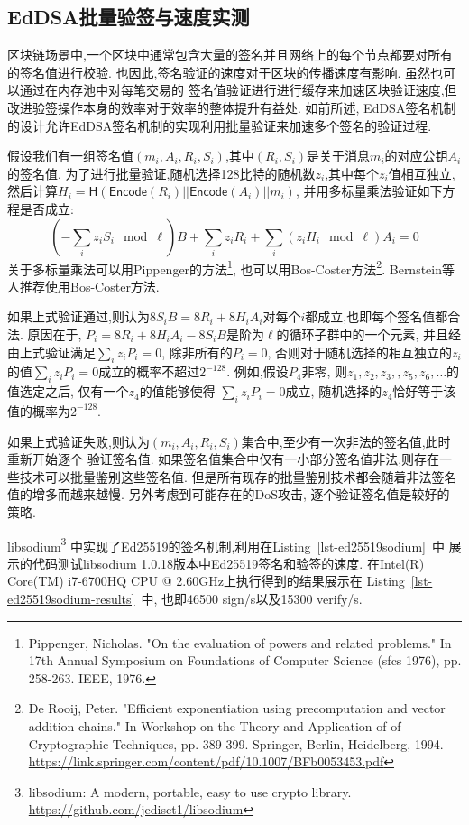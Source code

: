 \subsection{EdDSA批量验签与速度实测}

区块链场景中,一个区块中通常包含大量的签名并且网络上的每个节点都要对所有的签名值进行校验.
也因此,签名验证的速度对于区块的传播速度有影响. 虽然也可以通过在内存池中对每笔交易的
签名值验证进行进行缓存来加速区块验证速度,但改进验签操作本身的效率对于效率的整体提升有益处.
如前所述, EdDSA签名机制的设计允许EdDSA签名机制的实现利用批量验证来加速多个签名的验证过程.

假设我们有一组签名值$(m_i, A_i, R_i, S_i)$,其中$(R_i, S_i)$是关于消息$m_i$的对应公钥$A_i$的签名值.
为了进行批量验证,随机选择128比特的随机数$z_i$,其中每个$z_i$值相互独立,
然后计算$H_i = \textsf{H}(\textsf{Encode}(R_i) || \textsf{Encode}(A_i) ||m_i)$,
并用多标量乘法验证如下方程是否成立:
$$
\left(-\sum_i z_iS_i \mod \ell\right)B + \sum_i z_i R_i + \sum_i(z_iH_i \mod \ell)A_i = 0
$$
关于多标量乘法可以用Pippenger的方法\footnote{
Pippenger, Nicholas. "On the evaluation of powers and related problems." 
In 17th Annual Symposium on Foundations of Computer Science (sfcs 1976), 
pp. 258-263. IEEE, 1976.},
也可以用Bos-Coster方法\footnote{
De Rooij, Peter. "Efficient exponentiation using precomputation and vector addition chains." 
In Workshop on the Theory and Application of of Cryptographic Techniques, 
pp. 389-399. Springer, Berlin, Heidelberg, 1994.
\url{https://link.springer.com/content/pdf/10.1007/BFb0053453.pdf}}.
Bernstein等人推荐使用Bos-Coster方法.

如果上式验证通过,则认为$8S_iB = 8R_i + 8H_iA_i$对每个$i$都成立,也即每个签名值都合法.
原因在于, $P_i = 8R_i + 8H_iA_i - 8S_iB$是阶为$\ell$的循环子群中的一个元素,
并且经由上式验证满足$\sum_i z_iP_i = 0$, 除非所有的$P_i = 0$, 
否则对于随机选择的相互独立的$z_i$的值$\sum_i z_iP_i = 0$成立的概率不超过$2^{-128}$.
例如,假设$P_4$非零, 则$z_1, z_2, z_3, , z_5, z_6, \ldots$的值选定之后, 仅有一个$z_4$的值能够使得
$\sum_i z_iP_i = 0$成立, 随机选择的$z_4$恰好等于该值的概率为$2^{-128}$.

如果上式验证失败,则认为$(m_i, A_i, R_i, S_i)$集合中,至少有一次非法的签名值,此时重新开始逐个
验证签名值. 如果签名值集合中仅有一小部分签名值非法,则存在一些技术可以批量鉴别这些签名值.
但是所有现存的批量鉴别技术都会随着非法签名值的增多而越来越慢. 另外考虑到可能存在的DoS攻击,
逐个验证签名值是较好的策略.

libsodium\footnote{libsodium: A modern, portable, easy to use crypto library.
\url{https://github.com/jedisct1/libsodium}}
中实现了Ed25519的签名机制,利用在Listing~\ref{lst-ed25519sodium}~中
展示的代码测试libsodium 1.0.18版本中Ed25519签名和验签的速度.
在Intel(R) Core(TM) i7-6700HQ CPU @ 2.60GHz上执行得到的结果展示在
Listing~\ref{lst-ed25519sodium-results}~中, 也即46500 sign/s以及15300 verify/s.

